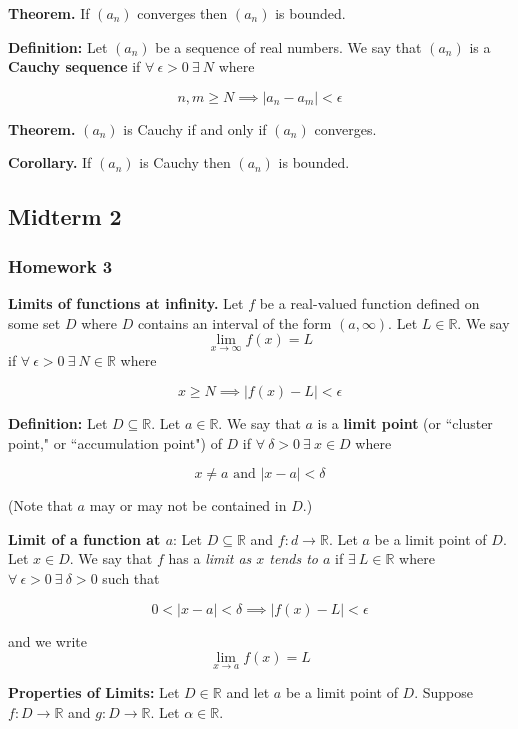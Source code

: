 \textbf{Theorem.} If \((a_n)\) converges then \((a_n)\) is bounded.

\textbf{Definition:} Let \((a_n)\) be a sequence of real numbers. We say that \((a_n)\) is a \textbf{Cauchy sequence} if \(\forall \ \epsilon > 0 \ \exists \ N\) where

\[
n, m \geq N \implies |a_n - a_m| < \epsilon
\]

\textbf{Theorem.} \((a_n)\) is Cauchy if and only if \((a_n)\) converges.

\textbf{Corollary.} If \((a_n)\) is Cauchy then \((a_n)\) is bounded.

\pagebreak

\subsection{Midterm 2}

\subsubsection{Homework 3}

\textbf{Limits of functions at infinity.} Let \(f\) be a real-valued function defined on some set \(D\) where \(D\) contains an interval of the form \((a, \infty)\). Let \(L \in \mathbb{R}\). We say \[\lim_{x \to \infty} f(x) = L\]if \(\forall \ \epsilon >0 \ \exists \ N \in \mathbb{R}\) where

\[
x \geq N \implies |f(x) - L| < \epsilon
\]

\textbf{Definition:} Let \(D \subseteq \mathbb{R}\). Let \(a \in \mathbb{R}\). We say that \(a\) is a \textbf{limit point} (or ``cluster point," or ``accumulation point") of \(D\) if \(\forall \ \delta > 0 \ \exists \ x \in D\) where

\[
x \neq a \text{ and } |x - a| < \delta
\]

(Note that \(a\) may or may not be contained in \(D\).)

\textbf{Limit of a function at \(a\)}: Let \(D \subseteq \mathbb{R}\) and \(f:d \to \mathbb{R}\). Let \(a\) be a limit point of \(D\). Let \(x \in D\). We say that \(f\) has a \textit{limit as \(x\) tends to \(a\)} if \(\exists \ L \in \mathbb{R}\) where \(\forall \ \epsilon > 0 \ \exists \ \delta > 0 \) such that

\[
0 < |x - a| < \delta \implies |f(x) - L| < \epsilon
\]

and we write \[\lim_{x \to a} f(x) = L\]

\textbf{Properties of Limits:} Let \(D \in \mathbb{R}\) and let \(a\) be a limit point of \(D\). Suppose \(f:D \to \mathbb{R}\) and \(g: D \to \mathbb{R}\). Let \(\alpha \in \mathbb{R}\).

